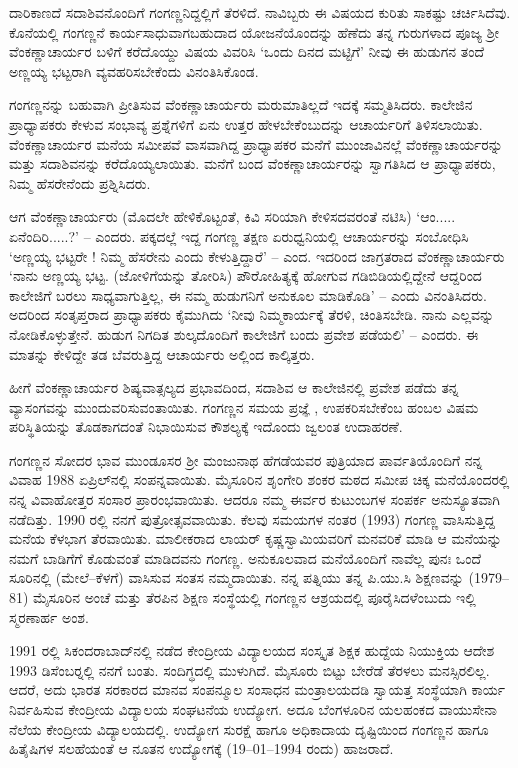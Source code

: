 ದಾರಿಕಾಣದೆ ಸದಾಶಿವನೊಂದಿಗೆ ಗಂಗಣ್ಣನಿದ್ದಲ್ಲಿಗೆ ತೆರಳಿದೆ. ನಾವಿಬ್ಬರು ಈ ವಿಷಯದ ಕುರಿತು ಸಾಕಷ್ಟು ಚರ್ಚಿಸಿದೆವು. ಕೊನೆಯಲ್ಲಿ ಗಂಗಣ್ಣನೆ ಕಾರ್ಯಸಾಧುವಾಗಬಹುದಾದ ಯೋಜನೆಯೊಂದನ್ನು ಹೆಣೆದು ತನ್ನ ಗುರುಗಳಾದ ಪೂಜ್ಯ ಶ್ರೀ ವೆಂಕಣ್ಣಾಚಾರ್ಯರ ಬಳಿಗೆ ಕರೆದೊಯ್ದು ವಿಷಯ ವಿವರಿಸಿ ‘ಒಂದು ದಿನದ ಮಟ್ಟಿಗೆ’ ನೀವು ಈ ಹುಡುಗನ ತಂದೆ ಅಣ್ಣಯ್ಯ ಭಟ್ಟರಾಗಿ ವ್ಯವಹರಿಸಬೇಕೆಂದು ವಿನಂತಿಸಿಕೊಂಡ.

ಗಂಗಣ್ಣನನ್ನು ಬಹುವಾಗಿ ಪ್ರೀತಿಸುವ ವೆಂಕಣ್ಣಾಚಾರ್ಯರು ಮರುಮಾತಿಲ್ಲದೆ ಇದಕ್ಕೆ ಸಮ್ಮತಿಸಿದರು. ಕಾಲೇಜಿನ ಪ್ರಾಧ್ಯಾಪಕರು ಕೇಳುವ ಸಂಭಾವ್ಯ ಪ್ರಶ್ನೆಗಳಿಗೆ ಏನು ಉತ್ತರ ಹೇಳಬೇಕೆಂಬುದನ್ನು ಆಚಾರ್ಯರಿಗೆ ತಿಳಿಸಲಾಯಿತು. ವೆಂಕಣ್ಣಾಚಾರ್ಯರ ಮನೆಯ ಸಮೀಪವೆ ವಾಸವಾಗಿದ್ದ ಪ್ರಾಧ್ಯಾಪಕರ ಮನೆಗೆ ಮುಂಜಾವಿನಲ್ಲೆ ವೆಂಕಣ್ಣಾಚಾರ್ಯರನ್ನು ಮತ್ತು ಸದಾಶಿವನನ್ನು ಕರೆದೊಯ್ಯಲಾಯಿತು. ಮನೆಗೆ ಬಂದ ವೆಂಕಣ್ಣಾಚಾರ್ಯರನ್ನು ಸ್ವಾಗತಿಸಿದ ಆ ಪ್ರಾಧ್ಯಾಪಕರು, ನಿಮ್ಮ ಹೆಸರೇನೆಂದು ಪ್ರಶ್ನಿಸಿದರು. 

ಆಗ ವೆಂಕಣ್ಣಾಚಾರ್ಯರು (ಮೊದಲೇ ಹೇಳಿಕೊಟ್ಟಂತೆ, ಕಿವಿ ಸರಿಯಾಗಿ ಕೇಳಿಸದವರಂತೆ ನಟಿಸಿ) ‘ಆಂ..... ಏನೆಂದಿರಿ.....?’ – ಎಂದರು. ಪಕ್ಕದಲ್ಲೆ ಇದ್ದ ಗಂಗಣ್ಣ ತಕ್ಷಣ ಏರುಧ್ವನಿಯಲ್ಲಿ ಆಚಾರ್ಯರನ್ನು ಸಂಬೋಧಿಸಿ ‘ಅಣ್ಣಯ್ಯ ಭಟ್ಟರೇ ! ನಿಮ್ಮ ಹೆಸರೇನು ಎಂದು ಕೇಳುತ್ತಿದ್ದಾರೆ’ – ಎಂದ. ಇದರಿಂದ ಜಾಗ್ರತರಾದ ವೆಂಕಣ್ಣಾಚಾರ್ಯರು ‘ನಾನು ಅಣ್ಣಯ್ಯ ಭಟ್ಟ. (ಜೋಳಿಗೆಯನ್ನು ತೋರಿಸಿ) ಪೌರೋಹಿತ್ಯಕ್ಕೆ ಹೋಗುವ ಗಡಿಬಿಡಿಯಲ್ಲಿದ್ದೇನೆ ಆದ್ದರಿಂದ ಕಾಲೇಜಿಗೆ ಬರಲು ಸಾಧ್ಯವಾಗುತ್ತಿಲ್ಲ, ಈ ನಮ್ಮ ಹುಡುಗನಿಗೆ ಅನುಕೂಲ ಮಾಡಿಕೊಡಿ’ – ಎಂದು ವಿನಂತಿಸಿದರು. ಅದರಿಂದ ಸಂತೃಪ್ತರಾದ ಪ್ರಾಧ್ಯಾಪಕರು ಕೈಮುಗಿದು ‘ನೀವು ನಿಮ್ಮಕಾರ್ಯಕ್ಕೆ ತೆರಳಿ, ಚಿಂತಿಸಬೇಡಿ. ನಾನು ಎಲ್ಲವನ್ನು ನೋಡಿಕೊಳ್ಳುತ್ತೇನೆ. ಹುಡುಗ ನಿಗದಿತ ಶುಲ್ಕದೊಂದಿಗೆ ಕಾಲೇಜಿಗೆ ಬಂದು ಪ್ರವೇಶ ಪಡೆಯಲಿ’ – ಎಂದರು. ಈ ಮಾತನ್ನು ಕೇಳಿದ್ದೇ ತಡ ಬೆವರುತ್ತಿದ್ದ ಆಚಾರ್ಯರು ಅಲ್ಲಿಂದ ಕಾಲ್ಕಿತ್ತರು.

ಹೀಗೆ ವೆಂಕಣ್ಣಾಚಾರ್ಯರ ಶಿಷ್ಯವಾತ್ಸಲ್ಯದ ಪ್ರಭಾವದಿಂದ, ಸದಾಶಿವ ಆ ಕಾಲೇಜಿನಲ್ಲಿ ಪ್ರವೇಶ ಪಡೆದು ತನ್ನ ವ್ಯಾಸಂಗವನ್ನು ಮುಂದುವರಿಸುವಂತಾಯಿತು. ಗಂಗಣ್ಣನ ಸಮಯ ಪ್ರಜ್ಞೆ , ಉಪಕರಿಸಬೇಕೆಂಬ ಹಂಬಲ ವಿಷಮ ಪರಿಸ್ಥಿತಿಯನ್ನು ತೊಡಕಾಗದಂತೆ ನಿಭಾಯಿಸುವ ಕೌಶಲ್ಯಕ್ಕೆ ಇದೊಂದು ಜ್ವಲಂತ ಉದಾಹರಣೆ. 

ಗಂಗಣ್ಣನ ಸೋದರ ಭಾವ ಮುಂಡೂಸರ ಶ್ರೀ ಮಂಜುನಾಥ ಹೆಗಡೆಯವರ ಪುತ್ರಿಯಾದ ಪಾರ್ವತಿಯೊಂದಿಗೆ ನನ್ನ ವಿವಾಹ 1988 ಏಪ್ರಿಲ್‍ನಲ್ಲಿ ಸಂಪನ್ನವಾಯಿತು. ಮೈಸೂರಿನ ಶೃಂಗೇರಿ ಶಂಕರ ಮಠದ ಸಮೀಪ ಚಿಕ್ಕ ಮನೆಯೊಂದರಲ್ಲಿ ನನ್ನ ವಿವಾಹೋತ್ತರ ಸಂಸಾರ ಪ್ರಾರಂಭವಾಯಿತು. ಆದರೂ ನಮ್ಮ ಈರ್ವರ ಕುಟುಂಬಗಳ ಸಂಪರ್ಕ ಅನುಸ್ಯೂತವಾಗಿ ನಡೆದಿತ್ತು. 1990 ರಲ್ಲಿ ನನಗೆ ಪುತ್ರೋತ್ಸವವಾಯಿತು. ಕೆಲವು ಸಮಯಗಳ ನಂತರ (1993) ಗಂಗಣ್ಣ ವಾಸಿಸುತ್ತಿದ್ದ ಮನೆಯ ಕೆಳಭಾಗ ತೆರವಾಯಿತು. ಮಾಲೀಕರಾದ ಲಾಯರ್ ಕೃಷ್ಣಸ್ವಾಮಿಯವರಿಗೆ ಮನವರಿಕೆ ಮಾಡಿ ಆ ಮನೆಯನ್ನು ನಮಗೆ ಬಾಡಿಗೆಗೆ ಕೊಡುವಂತೆ ಮಾಡಿದವನು ಗಂಗಣ್ಣ. ಅನುಕೂಲವಾದ ಮನೆಯೊಂದಿಗೆ ನಾವೆಲ್ಲ ಪುನಃ ಒಂದೆ ಸೂರಿನಲ್ಲಿ (ಮೇಲೆ–ಕೆಳಗೆ) ವಾಸಿಸುವ ಸಂತಸ ನಮ್ಮದಾಯಿತು. ನನ್ನ ಪತ್ನಿಯು ತನ್ನ ಪಿ.ಯು.ಸಿ ಶಿಕ್ಷಣವನ್ನು (1979–81) ಮೈಸೂರಿನ ಅಂಚೆ ಮತ್ತು ತೆರಪಿನ ಶಿಕ್ಷಣ ಸಂಸ್ಥೆಯಲ್ಲಿ ಗಂಗಣ್ಣನ ಆಶ್ರಯದಲ್ಲಿ ಪೂರೈಸಿದಳೆಂಬುದು ಇಲ್ಲಿ ಸ್ಮರಣಾರ್ಹ ಅಂಶ.

1991 ರಲ್ಲಿ ಸಿಕಂದರಾಬಾದ್‍ನಲ್ಲಿ ನಡೆದ ಕೇಂದ್ರೀಯ ವಿದ್ಯಾಲಯದ ಸಂಸ್ಕೃತ ಶಿಕ್ಷಕ ಹುದ್ದೆಯ ನಿಯುಕ್ತಿಯ ಆದೇಶ 1993 ಡಿಸೆಂಬರ್‍ನಲ್ಲಿ ನನಗೆ ಬಂತು. ಸಂದಿಗ್ಧದಲ್ಲಿ ಮುಳುಗಿದೆ. ಮೈಸೂರು ಬಿಟ್ಟು ಬೇರೆಡೆ ತೆರಳಲು ಮನಸ್ಸಿರಲಿಲ್ಲ. ಆದರೆ, ಅದು  ಭಾರತ ಸರಕಾರದ ಮಾನವ ಸಂಪನ್ಮೂಲ ಸಂಸಾಧನ ಮಂತ್ರಾಲಯದಡಿ ಸ್ವಾಯತ್ತ ಸಂಸ್ಥೆಯಾಗಿ ಕಾರ್ಯ ನಿರ್ವಹಿಸುವ ಕೇಂದ್ರೀಯ ವಿದ್ಯಾಲಯ ಸಂಘಟನೆಯ ಉದ್ಯೋಗ. ಅದೂ ಬೆಂಗಳೂರಿನ ಯಲಹಂಕದ ವಾಯುಸೇನಾ ನೆಲೆಯ ಕೇಂದ್ರೀಯ ವಿದ್ಯಾಲಯದಲ್ಲಿ. ಉದ್ಯೋಗ ಸುರಕ್ಷೆ ಹಾಗೂ ಅಧಿಕಾದಾಯ ದೃಷ್ಟಿಯಿಂದ ಗಂಗಣ್ಣನ ಹಾಗೂ ಹಿತೈಷಿಗಳ ಸಲಹೆಯಂತೆ ಆ ನೂತನ ಉದ್ಯೋಗಕ್ಕೆ (19–01–1994 ರಂದು) ಹಾಜರಾದೆ.

